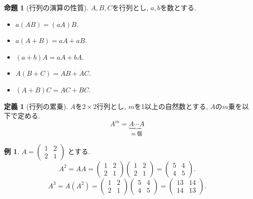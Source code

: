 \documentclass[dvipdfmx,a4paper,11pt]{article}
\theoremstyle{definition}
\newtheorem{prop}[thm]{命題}
\newtheorem{dfn}[thm]{定義}
\newtheorem{exa}[thm]{例}
\begin{document}
 \begin{tcolorbox}[
    colback = white,
    colframe = green!35!black,
    fonttitle = \bfseries,
    breakable = true]
    \begin{prop}[行列の演算の性質]
$A,B,C$を行列とし, $a,b$を数とする.
 \begin{itemize}
 	\setlength{\parskip}{0cm}
  	\setlength{\itemsep}{0pt}
 \item $a(AB)=(aA)B$. 
  \item $a(A+B)=aA + aB$. 
  \item $(a+b)A = aA + bA$.　
  \item $A(B+C) = AB + AC$.
  \item $(A+B)C = AC + BC$.
 \end{itemize}
  \end{prop}
 \end{tcolorbox}
 


 
  \begin{tcolorbox}[
    colback = white,
    colframe = green!35!black,
    fonttitle = \bfseries,
    breakable = true]
    \begin{dfn}[行列の累乗]
    
$A$を$2 \times 2$行列とし, $m$を1以上の自然数とする, $A$の$m$乗を以下で定める.
$$A^{m} = \underbrace{A \cdots A}_{m \text{ 個}}$$

  \end{dfn}
 \end{tcolorbox}
 
 
 
 

 
  \begin{exa}
  $ A= 
 \begin{pmatrix}
1& 2\\
2 & 1
 \end{pmatrix}
$ とする. 
 $$
 A^2 =
 AA 
 =
 \begin{pmatrix}
1& 2\\
2 & 1
 \end{pmatrix}
 \begin{pmatrix}
1& 2\\
2 & 1
 \end{pmatrix}
 =  
 \begin{pmatrix}
5& 4\\
4 & 5
 \end{pmatrix}.
 $$
  $$
 A^3 =
 A(A^2) 
 =
 \begin{pmatrix}
1& 2\\
2 & 1
 \end{pmatrix}
 \begin{pmatrix}
5& 4\\
4 & 5
 \end{pmatrix}
 =  
 \begin{pmatrix}
13& 14\\
14 & 13
 \end{pmatrix}.
 $$

 \end{exa}
 
\end{document}
